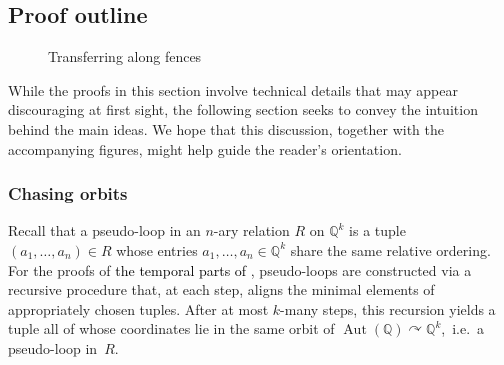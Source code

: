 \documentclass[a4paper,reqno, cleveref]{amsart}
\newcommand{\Q}{\mathbb{Q}}
\newcommand{\acts}{\curvearrowright}
\DeclareMathOperator{\Aut}{Aut}
\newcommand\jo[1]{\textcolor{black}{#1}} %
\begin{document}
\subsection{Proof outline}\label{sect:outline}
\begin{figure}[t]
 \caption{Transferring along fences}
    \label{fig:fence}
\centering
\vspace{\baselineskip}

\end{figure}
While the proofs in this section involve technical details that may appear discouraging at first sight, the following section seeks to convey the intuition behind the main ideas. We hope that this discussion, together with the accompanying figures, might help guide the reader's orientation.


\subsubsection{Chasing orbits}
Recall that a pseudo-loop in an $n$-ary relation $R $ on $ \Q^k$ is a tuple $(a_1, \dots, a_n)\in R$ whose entries $a_1, \dots, a_n\in \Q^k$ share the same relative ordering. For the proofs of \jo{the temporal parts of }, pseudo-loops are constructed via a recursive procedure that, at each step, aligns the minimal elements of appropriately chosen tuples. After at most $k$-many steps, this recursion yields a tuple all of whose coordinates lie in the same orbit of $\Aut(\Q)\acts \Q^k$,~i.e.~a pseudo-loop in~$R$.
\end{document}
